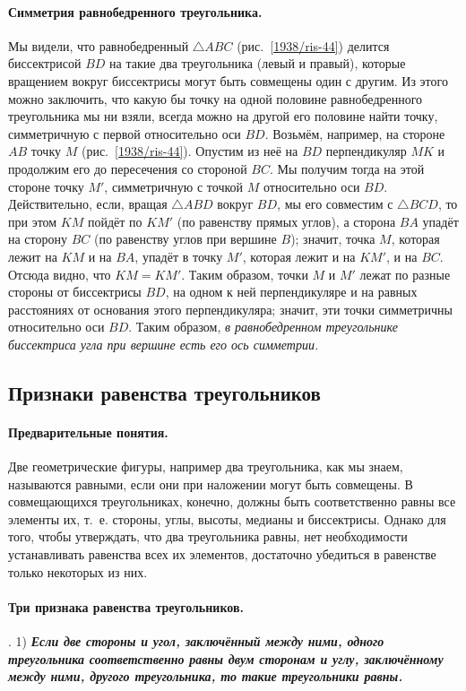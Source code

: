 \documentclass[oneside]{book}
\begin{document}
\paragraph{Симметрия равнобедренного треугольника.}\label{1938/40}
Мы видели, что равнобедренный $\triangle ABC$ (рис.~\ref{1938/ris-44}) делится биссектрисой $BD$ на такие два треугольника (левый и правый), которые вращением вокруг биссектрисы могут быть совмещены один с другим.
Из этого можно заключить, что какую бы точку на одной половине равнобедренного треугольника мы ни взяли, всегда можно на другой его половине найти точку, симметричную с первой относительно оси $BD$.
Возьмём, например, на стороне $AB$ точку $M$ (рис.~\ref{1938/ris-44}).
Опустим из неё на $BD$ перпендикуляр $MK$ и продолжим его до пересечения со стороной $BC$.
Мы получим тогда на этой стороне точку $M'$, симметричную с точкой $M$ относительно оси $BD$.
Действительно, если, вращая $\triangle ABD$ вокруг $BD$, мы его совместим с $\triangle BCD$, то при этом $KM$ пойдёт по $KM'$ (по равенству прямых углов), а сторона $BA$ упадёт на сторону $BC$ (по равенству углов при вершине $B$);
значит, точка $M$, которая лежит на $KM$ и на $BA$, упадёт в точку $M'$, которая лежит и на $KM'$, и на $BC$.
Отсюда видно, что $KM=KM'$.
Таким образом, точки $M$ и $M'$ лежат по разные стороны от биссектрисы $BD$, на одном к ней перпендикуляре и на равных расстояниях от основания этого перпендикуляра;
значит, эти точки симметричны относительно оси $BD$.
Таким образом, \emph{в равнобедренном треугольнике биссектриса угла при вершине есть его ось симметрии.}

\subsection*{Признаки равенства треугольников}

\paragraph{Предварительные понятия.}\label{1938/41}
Две геометрические фигуры, например два треугольника, как мы знаем, называются равными, если они при наложении могут быть совмещены.
В совмещающихся треугольниках, конечно, должны быть соответственно равны все элементы их, т.~е. стороны, углы, высоты, медианы и биссектрисы.
Однако для того, чтобы утверждать, что два треугольника равны, нет необходимости устанавливать равенства всех их элементов, достаточно убедиться в равенстве только некоторых из них.

\paragraph{Три признака равенства треугольников.}\label{1938/42}
.
1) \textbf{\emph{Если две стороны и угол, заключённый
между ними, одного треугольника соответственно равны
двум сторонам и углу, заключённому между ними, другого треугольника, то такие треугольники равны.}}
\end{document}
